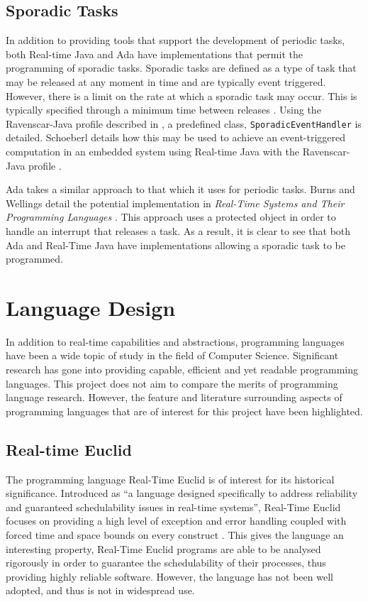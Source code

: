 \subsection{Sporadic Tasks}
In addition to providing tools that support the development of periodic tasks,
both Real-time Java and Ada have implementations that permit the programming of
sporadic tasks.  Sporadic tasks are defined as a type of task that may be
released at any moment in time and are typically event triggered. However,
there is a limit on the rate at which a sporadic task may occur. This is
typically specified through a minimum time between releases \cite{11111101}.
Using the Ravenscar-Java profile described in \cite{ravenscar-java}, a
predefined class, \texttt{SporadicEventHandler} is detailed. Schoeberl details
how this may be used to achieve an event-triggered computation in an embedded
system using Real-time Java with the Ravenscar-Java profile \cite{1300334}.
\par\bigskip\noindent
Ada takes a similar approach to that which it uses for periodic tasks. Burns
and Wellings detail the potential implementation in \emph{Real-Time Systems and
Their Programming Languages} \cite[p341]{real-time-systems}.  This approach
uses a protected object in order to handle an interrupt that releases a task.
As a result, it is clear to see that both Ada and Real-Time Java have
implementations allowing a sporadic task to be programmed. 

\section{Language Design} 
In addition to real-time capabilities and
abstractions, programming languages have been a wide topic of study in the
field of Computer Science. Significant research has gone into providing
capable, efficient and yet readable programming languages. This project
does not aim to compare the merits of programming language research. However, the
feature and literature surrounding aspects of programming languages that are of
interest for this project have been highlighted. 

\subsection{Real-time Euclid} 
The programming language Real-Time Euclid is of interest for its historical 
significance. Introduced as ``a language designed specifically to address reliability 
and guaranteed schedulability issues in real-time systems'', Real-Time Euclid 
focuses on providing a high level of exception and error handling coupled with 
forced time and space bounds on every construct \cite{real-time-euclid}. This 
gives the language an interesting property, Real-Time Euclid programs are able 
to be analysed rigorously in order to guarantee the schedulability of their 
processes, thus providing highly reliable software. However, the language has not 
been well adopted, and thus is not in widespread use. 

